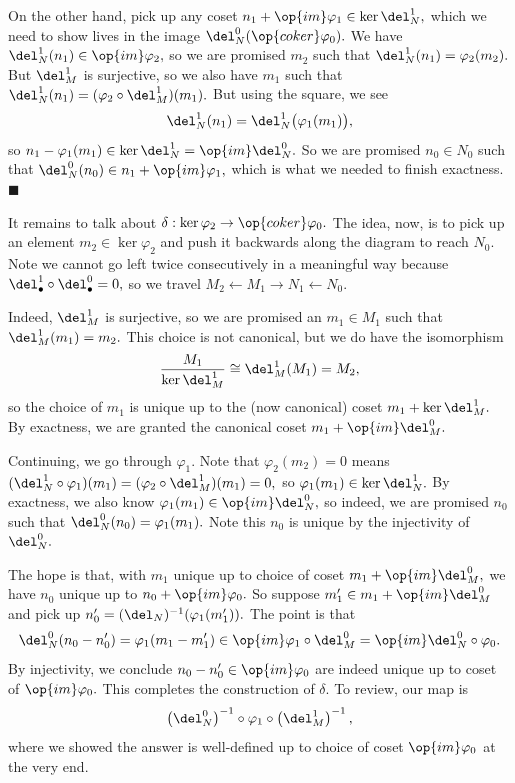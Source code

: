 On the other hand, pick up any coset $n_1+\op{im}\varphi_1\in\ker\del_N^1,$ which we need to show lives in the image $\del_N^0(\op{coker}\varphi_0).$ We have $\del_N^1(n_1)\in\op{im}\varphi_2,$ so we are promised $m_2$ such that $\del_N^1(n_1)=\varphi_2(m_2).$ But $\del_M^1$ is surjective, so we also have $m_1$ such that $\del_N^1(n_1)=(\varphi_2\circ\del_M^1)(m_1).$ But using the square, we see
\[\del_N^1(n_1)=\del_N^1\big(\varphi_1(m_1)\big),\]
so $n_1-\varphi_1(m_1)\in\ker\del_N^1=\op{im}\del_N^0.$ So we are promised $n_0\in N_0$ such that $\del_N^0(n_0)\in n_1+\op{im}\varphi_1,$ which is what we needed to finish exactness. $\blacksquare$

It remains to talk about $\delta:\ker\varphi_2\to\op{coker}\varphi_0.$ The idea, now, is to pick up an element $m_2\in\ker\varphi_2$ and push it backwards along the diagram to reach $N_0.$ Note we cannot go left twice consecutively in a meaningful way because $\del_\bullet^1\circ\del_\bullet^0=0,$ so we travel $M_2\leftarrow M_1\to N_1\leftarrow N_0.$

Indeed, $\del_M^1$ is surjective, so we are promised an $m_1\in M_1$ such that $\del_M^1(m_1)=m_2.$ This choice is not canonical, but we do have the isomorphism
\[\frac{M_1}{\ker\del_M^1}\cong\del_M^1(M_1)=M_2,\]
so the choice of $m_1$ is unique up to the (now canonical) coset $m_1+\ker\del_M^1.$ By exactness, we are granted the canonical coset $m_1+\op{im}\del_M^0.$

Continuing, we go through $\varphi_1.$ Note that $\varphi_2(m_2)=0$ means $(\del_N^1\circ\varphi_1)(m_1)=(\varphi_2\circ\del_M^1)(m_1)=0,$ so $\varphi_1(m_1)\in\ker\del_N^1.$ By exactness, we also know $\varphi_1(m_1)\in\op{im}\del_N^0,$ so indeed, we are promised $n_0$ such that $\del_N^0(n_0)=\varphi_1(m_1).$ Note this $n_0$ is unique by the injectivity of $\del_N^0.$

The hope is that, with $m_1$ unique up to choice of coset $m_1+\op{im}\del_M^0,$ we have $n_0$ unique up to $n_0+\op{im}\varphi_0.$ So suppose $m_1'\in m_1+\op{im}\del_M^0$ and pick up $n_0'=(\del_N)^{-1}(\varphi_1(m_1')).$ The point is that
\[\del_N^0(n_0-n_0')=\varphi_1(m_1-m_1')\in\op{im}\varphi_1\circ\del_M^0=\op{im}\del_N^0\circ\varphi_0.\]
By injectivity, we conclude $n_0-n_0'\in\op{im}\varphi_0$ are indeed unique up to coset of $\op{im}\varphi_0.$ This completes the construction of $\delta.$ To review, our map is
\[\left(\del_N^0\right)^{-1}\circ\varphi_1\circ\left(\del_M^1\right)^{-1},\]
where we showed the answer is well-defined up to choice of coset $\op{im}\varphi_0$ at the very end.

